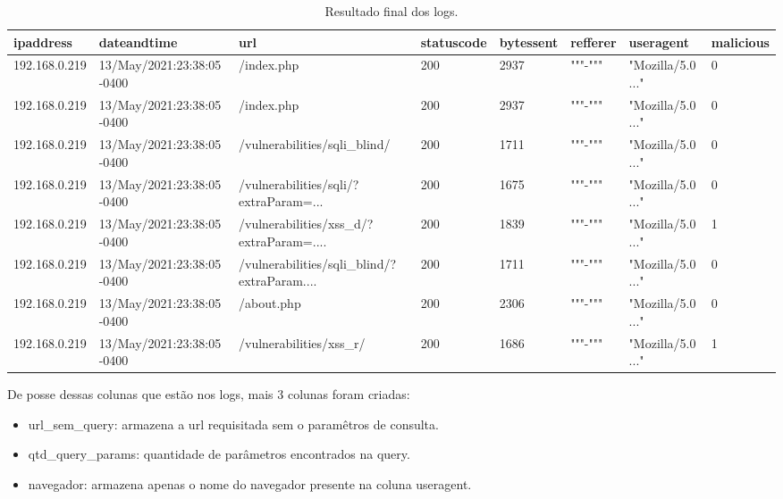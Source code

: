 \begin{table}
\centering

\begin{tabular}{|l|l|l|l|l|l|l|l|}
\hline
    ipaddress & dateandtime & url & statuscode & bytessent & refferer & useragent & malicious \\ \hline
    192.168.0.219 & 13/May/2021:23:38:05 -0400 & /index.php & 200 & 2937 & """-""" & "Mozilla/5.0 ..." & 0 \\ \hline
    192.168.0.219 & 13/May/2021:23:38:05 -0400 & /index.php & 200 & 2937 & """-""" & "Mozilla/5.0 ..." & 0 \\ \hline
    192.168.0.219 & 13/May/2021:23:38:05 -0400 & /vulnerabilities/sqli\_blind/ & 200 & 1711 & """-""" & "Mozilla/5.0 ..." & 0 \\ \hline
    192.168.0.219 & 13/May/2021:23:38:05 -0400 & /vulnerabilities/sqli/?extraParam=... & 200 & 1675 & """-""" & "Mozilla/5.0 ..." & 0 \\ \hline
    192.168.0.219 & 13/May/2021:23:38:05 -0400 & /vulnerabilities/xss\_d/?extraParam=.... & 200 & 1839 & """-""" & "Mozilla/5.0 ..." & 1 \\ \hline
    192.168.0.219 & 13/May/2021:23:38:05 -0400 & /vulnerabilities/sqli\_blind/?extraParam.... & 200 & 1711 & """-""" & "Mozilla/5.0 ..." & 0 \\ \hline
    192.168.0.219 & 13/May/2021:23:38:05 -0400 & /about.php & 200 & 2306 & """-""" & "Mozilla/5.0 ..." & 0 \\ \hline
    192.168.0.219 & 13/May/2021:23:38:05 -0400 & /vulnerabilities/xss\_r/ & 200 & 1686 & """-""" & "Mozilla/5.0 ..." & 1 \\ \hline
\end{tabular}

\caption{Resultado final dos logs.\label{tab:exemplo_log}}

\end{table}

De posse dessas colunas que estão nos logs, mais 3 colunas foram criadas:

\begin{itemize}
    \item url\_sem\_query: armazena a url requisitada sem o paramêtros de consulta.
    \item qtd\_query\_params: quantidade de parâmetros encontrados na query.
    \item navegador: armazena apenas o nome do navegador presente na coluna useragent.
\end{itemize}


